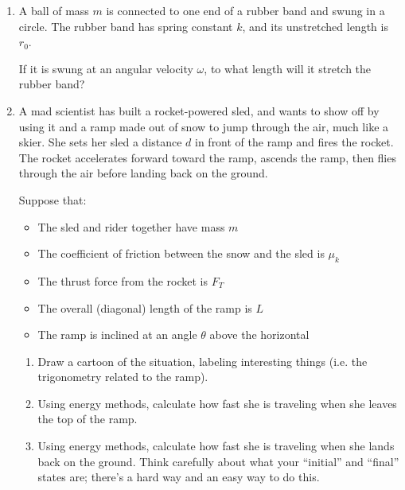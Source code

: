\documentclass[12pt]{article}
\begin{document}
\Large
\centerline{}
\normalsize
\centerline{}

\begin{enumerate}

\item A ball of mass $m$ is connected to one end of a rubber band and swung in a circle. The rubber band has spring constant $k$, and
its unstretched length is $r_0$.

If it is swung at an angular velocity $\omega$, to what length will it stretch the rubber band?

\vspace{3in}


\item A mad scientist has built a rocket-powered sled, and wants to show off by using it and a ramp made out of
snow to jump through the air, much like a skier. She sets her sled a distance $d$ in front of the ramp
and fires the rocket. The rocket accelerates forward toward the ramp, ascends the ramp, then flies through
the air before landing back on the ground.

Suppose that:

\begin{itemize}
\item The sled and rider together have mass $m$
\item The coefficient of friction between the snow and the sled is $\mu_k$
\item The thrust force from the rocket is $F_T$
\item The overall (diagonal) length of the ramp is $L$
\item The ramp is inclined at an angle $\theta$ above the horizontal
\end{itemize}

\begin{enumerate}

\item Draw a cartoon of the situation, labeling interesting things (i.e. the trigonometry related to the ramp).

\vspace{2in}

\item Using energy methods, calculate how fast she is traveling when she leaves the top of the ramp.

\vspace{2in}

\item Using energy methods, calculate how fast she is traveling when she lands back on the ground. Think 
carefully about what your ``initial'' and ``final'' states are; there's a hard way and an easy way to do this.


\end{enumerate}
\end{enumerate}
\end{document}
